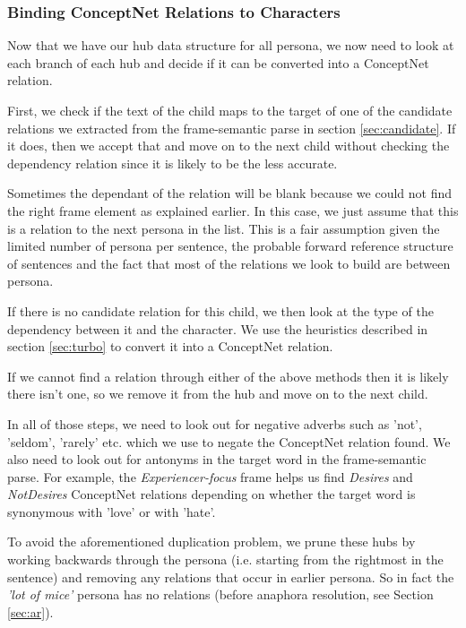 \subsubsection{Binding ConceptNet Relations to Characters}
	
Now that we have our hub data structure for all persona, we now need to look at each branch of each hub and decide if it can be converted into a ConceptNet relation.

First, we check if the text of the child maps to the target of one of the candidate relations we extracted from the frame-semantic parse in section \ref{sec:candidate}. If it does, then we accept that and move on to the next child without checking the dependency relation since it is likely to be the less accurate. 

Sometimes the dependant of the relation will be blank because we could not find the right frame element as explained earlier. In this case, we just assume that this is a relation to the next persona in the list. This is a fair assumption given the limited number of persona per sentence, the probable forward reference structure of sentences and the fact that most of the relations we look to build are between persona.

If there is no candidate relation for this child, we then look at the type of the dependency between it and the character. We use the heuristics described in section \ref{sec:turbo} to convert it into a ConceptNet relation.

If we cannot find a relation through either of the above methods then it is likely there isn't one, so we remove it from the hub and move on to the next child.

In all of those steps, we need to look out for negative adverbs such as 'not', 'seldom', 'rarely' etc. which we use to negate the ConceptNet relation found. We also need to look out for antonyms in the target word in the frame-semantic parse. For example, the \textit{Experiencer-focus} frame helps us find \textit{Desires} and \textit{NotDesires} ConceptNet relations depending on whether the target word is synonymous with 'love' or with 'hate'.

To avoid the aforementioned duplication problem, we prune these hubs by working backwards through the persona (i.e. starting from the rightmost in the sentence) and removing any relations that occur in earlier persona. So in fact the \textit{'lot of mice'} persona has no relations (before anaphora resolution, see Section \ref{sec:ar}).

